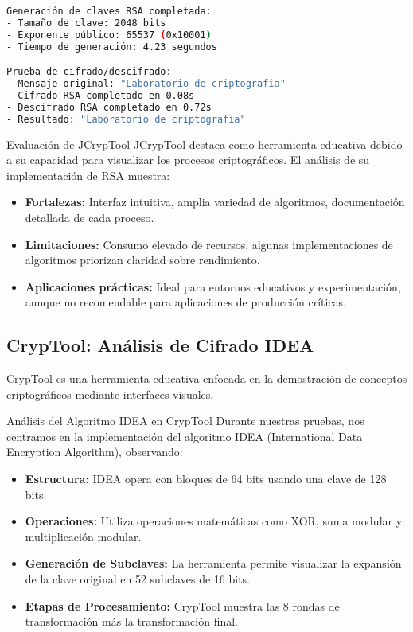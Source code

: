 \begin{lstlisting}[language=bash, caption={Salida de Generación de Claves RSA}, label=lst:rsa-keys]
Generación de claves RSA completada:
- Tamaño de clave: 2048 bits
- Exponente público: 65537 (0x10001)
- Tiempo de generación: 4.23 segundos

Prueba de cifrado/descifrado:
- Mensaje original: "Laboratorio de criptografia"
- Cifrado RSA completado en 0.08s
- Descifrado RSA completado en 0.72s
- Resultado: "Laboratorio de criptografia"
\end{lstlisting}

\begin{cryptoanalysis}{Evaluación de JCrypTool}
	JCrypTool destaca como herramienta educativa debido a su capacidad para visualizar los procesos criptográficos. El análisis de su implementación de RSA muestra:

	\begin{itemize}
		\item \textbf{Fortalezas:} Interfaz intuitiva, amplia variedad de algoritmos, documentación detallada de cada proceso.

		\item \textbf{Limitaciones:} Consumo elevado de recursos, algunas implementaciones de algoritmos priorizan claridad sobre rendimiento.

		\item \textbf{Aplicaciones prácticas:} Ideal para entornos educativos y experimentación, aunque no recomendable para aplicaciones de producción críticas.
	\end{itemize}
\end{cryptoanalysis}

\subsection{CrypTool: Análisis de Cifrado IDEA}

CrypTool es una herramienta educativa enfocada en la demostración de conceptos criptográficos mediante interfaces visuales.

\begin{cryptomethod}{Análisis del Algoritmo IDEA en CrypTool}
	Durante nuestras pruebas, nos centramos en la implementación del algoritmo IDEA (International Data Encryption Algorithm), observando:

	\begin{itemize}
		\item \textbf{Estructura:} IDEA opera con bloques de 64 bits usando una clave de 128 bits.

		\item \textbf{Operaciones:} Utiliza operaciones matemáticas como XOR, suma modular y multiplicación modular.

		\item \textbf{Generación de Subclaves:} La herramienta permite visualizar la expansión de la clave original en 52 subclaves de 16 bits.

		\item \textbf{Etapas de Procesamiento:} CrypTool muestra las 8 rondas de transformación más la transformación final.
	\end{itemize}
\end{cryptomethod}

